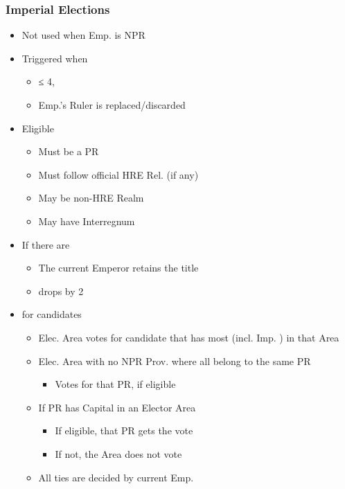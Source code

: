 \documentclass[10pt]{article}
\begin{document}
\subsubsection*{Imperial Elections }
\begin{itemize}
	\item Not used when Emp. is NPR 
	\item Triggered when
	\begin{itemize}
		\item \authority ≤ 4, 
		\item Emp.'s Ruler is replaced/discarded
	\end{itemize}
	\item Eligible 
	\begin{itemize}
		\item Must be a PR
		\item Must follow official HRE Rel. (if any)
		\item May be non-HRE Realm
		\item May have Interregnum
	\end{itemize}
	\item If there are 
	\begin{itemize}
		\item The current Emperor retains the title
		\item \authority drops by 2
	\end{itemize}
	\item {} for candidates
	\begin{itemize}
		\item Elec. Area votes for candidate that has most \influence (incl. Imp. \influence) in that Area
		\item Elec. Area with no NPR Prov. where all \vassals belong to the same PR
		\begin{itemize}
			\item Votes for that PR, if eligible
		\end{itemize}
		\item If PR has Capital in an Elector Area
		\begin{itemize}
			\item If eligible, that PR gets the vote
			\item If not, the Area does not vote
		\end{itemize}
		\item All ties are decided by current Emp.
	\end{itemize}

\end{itemize}
\end{document}

